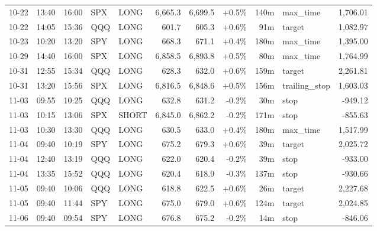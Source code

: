 \documentclass[11pt,a4paper,twoside]{article}
\begin{document}
\begin{center}
\begin{longtable}{>{\color{txtmain}}l l l l l r r r r >{\color{txtmain}}l r}
10-22 & 13:40 & 16:00 & SPX & LONG & 6,665.3 & 6,699.5 & \textcolor{wingreen}{+0.5\%} & 140m & max\_time & \textcolor{wingreen}{1,706.01} \\
10-22 & 14:05 & 15:36 & QQQ & LONG & 601.7 & 605.3 & \textcolor{wingreen}{+0.6\%} & 91m & target & \textcolor{wingreen}{1,082.97} \\
10-23 & 10:20 & 13:20 & SPY & LONG & 668.3 & 671.1 & \textcolor{wingreen}{+0.4\%} & 180m & max\_time & \textcolor{wingreen}{1,395.00} \\
10-29 & 14:40 & 16:00 & SPX & LONG & 6,858.5 & 6,893.8 & \textcolor{wingreen}{+0.5\%} & 80m & max\_time & \textcolor{wingreen}{1,764.99} \\
10-31 & 12:55 & 15:34 & QQQ & LONG & 628.3 & 632.0 & \textcolor{wingreen}{+0.6\%} & 159m & target & \textcolor{wingreen}{2,261.81} \\
10-31 & 13:20 & 15:56 & SPX & LONG & 6,816.5 & 6,848.6 & \textcolor{wingreen}{+0.5\%} & 156m & trailing\_stop & \textcolor{wingreen}{1,603.03} \\
11-03 & 09:55 & 10:25 & QQQ & LONG & 632.8 & 631.2 & \textcolor{lossred}{-0.2\%} & 30m & stop & \textcolor{lossred}{-949.12} \\
11-03 & 10:15 & 13:06 & SPX & SHORT & 6,845.0 & 6,862.2 & \textcolor{lossred}{-0.2\%} & 171m & stop & \textcolor{lossred}{-855.63} \\
11-03 & 10:30 & 13:30 & QQQ & LONG & 630.5 & 633.0 & \textcolor{wingreen}{+0.4\%} & 180m & max\_time & \textcolor{wingreen}{1,517.99} \\
11-04 & 09:40 & 10:19 & SPY & LONG & 675.2 & 679.3 & \textcolor{wingreen}{+0.6\%} & 39m & target & \textcolor{wingreen}{2,025.72} \\
11-04 & 12:40 & 13:19 & QQQ & LONG & 622.0 & 620.4 & \textcolor{lossred}{-0.2\%} & 39m & stop & \textcolor{lossred}{-933.00} \\
11-04 & 13:35 & 15:52 & QQQ & LONG & 620.4 & 618.9 & \textcolor{lossred}{-0.3\%} & 137m & stop & \textcolor{lossred}{-930.66} \\
11-05 & 09:40 & 10:06 & QQQ & LONG & 618.8 & 622.5 & \textcolor{wingreen}{+0.6\%} & 26m & target & \textcolor{wingreen}{2,227.68} \\
11-05 & 09:40 & 11:44 & SPY & LONG & 675.0 & 679.0 & \textcolor{wingreen}{+0.6\%} & 124m & target & \textcolor{wingreen}{2,024.85} \\
11-06 & 09:40 & 09:54 & SPY & LONG & 676.8 & 675.2 & \textcolor{lossred}{-0.2\%} & 14m & stop & \textcolor{lossred}{-846.06} \\

\end{longtable}
\end{center}
\end{document}
